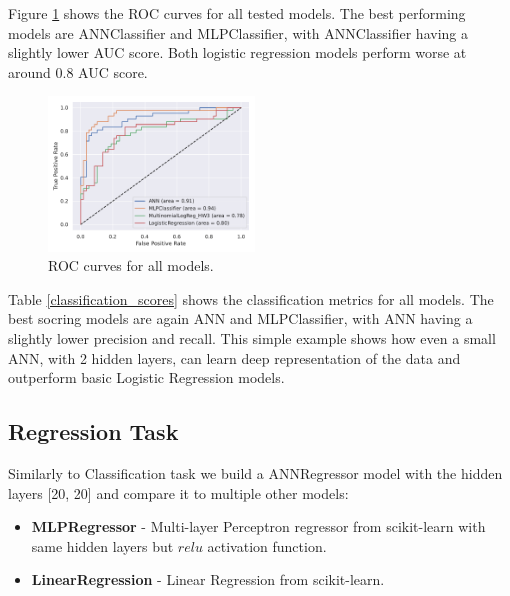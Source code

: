 \documentclass[9pt]{IEEEtran}
\begin{document}
Figure \ref{fig:roc} shows the ROC curves for all tested models.
The best performing models are ANNClassifier and MLPClassifier, with ANNClassifier having a slightly lower AUC score.
Both logistic regression models perform worse at around 0.8 AUC score.
\begin{figure}[H]
    \centering
    \includegraphics[width=0.488\textwidth]{roc_curve.pdf}
    \caption{ROC curves for all models.}
    \label{fig:roc}
\end{figure}

Table \ref{classification_scores} shows the classification metrics for all models.
The best socring models are again ANN and MLPClassifier, with ANN having a slightly lower precision and recall.
This simple example shows how even a small ANN, with 2 hidden layers, can learn deep representation of the data and outperform basic Logistic Regression models.


\subsection{Regression Task}
Similarly to Classification task we build a ANNRegressor model with the hidden layers [20, 20] and compare it to multiple other models:
\begin{itemize}
    \item \textbf{MLPRegressor} - Multi-layer Perceptron regressor from scikit-learn with same hidden layers but $relu$ activation function.
    \item \textbf{LinearRegression} - Linear Regression from scikit-learn.
\end {itemize}
\end{document}
